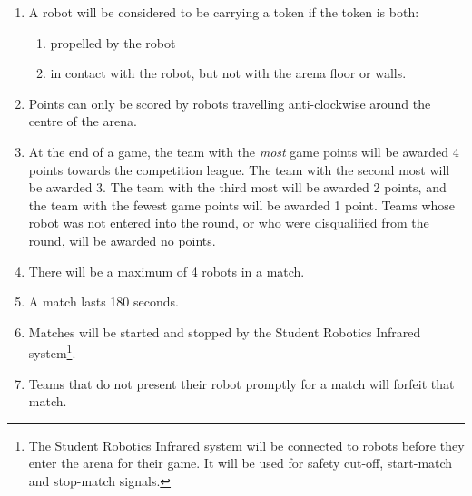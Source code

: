 \begin{enumerate}
\item A robot will be considered to be carrying a token if the token is both:
  \begin{enumerate}
  \item propelled by the robot
  \item in contact with the robot, but not with the arena floor or walls.
  \end{enumerate}

\item Points can only be scored by robots travelling anti-clockwise around the centre of the arena.

\item At the end of a game, the team with the \emph{most} game points will be awarded 4 points towards the competition league.
 The team with the second most will be awarded 3.
 The team with the third most will be awarded 2 points, and the team with the fewest game points will be awarded 1 point.
 Teams whose robot was not entered into the round, or who were disqualified from the round, will be awarded no points.

\item There will be a maximum of 4 robots in a match.
\item A match lasts 180 seconds.
\item Matches will be started and stopped by the Student Robotics Infrared system\footnote{The Student Robotics Infrared system will be connected to robots before they enter the arena for their game.  It will be used for safety cut-off, start-match and stop-match signals.}.
\item Teams that do not present their robot promptly for a match will forfeit that match.
\end{enumerate}
